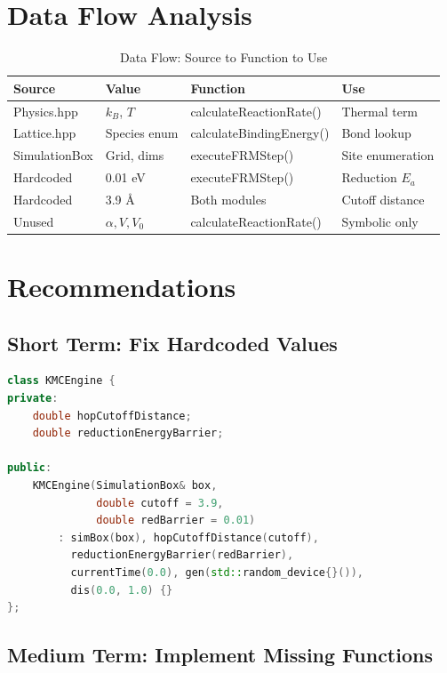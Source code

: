 \documentclass[11pt,a4paper]{article}
\begin{document}
\newpage

\section{Data Flow Analysis}

\begin{table}[H]
\centering
\caption{Data Flow: Source to Function to Use}
\begin{tabular}{|l|l|l|l|}
\hline
\textbf{Source} & \textbf{Value} & \textbf{Function} & \textbf{Use} \\
\hline
Physics.hpp & $k_B$, $T$ & calculateReactionRate() & Thermal term \\
Lattice.hpp & Species enum & calculateBindingEnergy() & Bond lookup \\
SimulationBox & Grid, dims & executeFRMStep() & Site enumeration \\
Hardcoded & 0.01 eV & executeFRMStep() & Reduction $E_a$ \\
Hardcoded & 3.9 Å & Both modules & Cutoff distance \\
Unused & $\alpha, V, V_0$ & calculateReactionRate() & Symbolic only \\
\hline
\end{tabular}
\end{table}

\newpage

\section{Recommendations}

\subsection{Short Term: Fix Hardcoded Values}

\begin{lstlisting}[language=C++, breaklines=true]
class KMCEngine {
private:
    double hopCutoffDistance;
    double reductionEnergyBarrier;
    
public:
    KMCEngine(SimulationBox& box, 
              double cutoff = 3.9,
              double redBarrier = 0.01)
        : simBox(box), hopCutoffDistance(cutoff), 
          reductionEnergyBarrier(redBarrier),
          currentTime(0.0), gen(std::random_device{}()),
          dis(0.0, 1.0) {}
};
\end{lstlisting}

\subsection{Medium Term: Implement Missing Functions}
\end{document}

